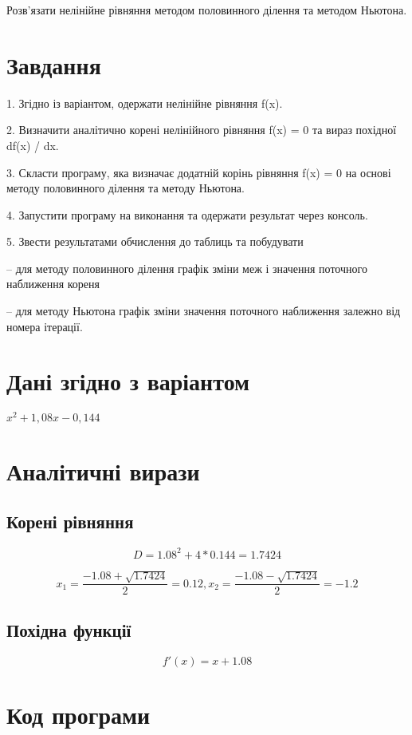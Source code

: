 \documentclass[a4paper, 12pt, oneside]{extarticle}
\renewcommand\Variant{$x^2 + 1,08 x - 0,144$}
\newcommand\tcobx[1]{
\begin{tcolorbox}[breakable, arc=0mm, colback=white, boxrule=0.2mm, beforeafter skip=0pt]
	#1
\end{tcolorbox}
}
\begin{document}
\Margins


\tcobx{
	Розв’язати нелінійне рівняння методом половинного ділення та методом Ньютона.
}

\section*{Завдання}
\tcobx{
	1. Згідно із варіантом, одержати нелінійне рівняння f(x).

2. Визначити аналітично корені нелінійного рівняння f(x) = 0 та вираз похідної df(x) / dx.

3. Скласти програму, яка визначає додатній корінь рівняння f(x) = 0 на основі методу половинного
ділення та методу Ньютона.

4. Запустити програму на виконання та одержати результат через консоль.

5. Звести результатами обчислення до таблиць та побудувати

– для методу половинного ділення графік зміни меж і значення поточного наближення кореня

– для методу Ньютона графік зміни значення поточного наближення залежно від номера ітерації.
}

\section*{Дані згідно з варіантом}

\tcobx{
	\Variant
}

\section*{ Аналітичні вирази }

\subsection*{ Корені рівняння }
\tcobx{
$$
D = 1.08^2+4*0.144 = 1.7424
$$

$$
x_1 = \frac{-1.08+\sqrt{1.7424}}{2} = 0.12,
x_2 = \frac{-1.08-\sqrt{1.7424}}{2}  = -1.2
$$
}

\subsection*{ Похідна функції }
\tcobx {
$$
f'(x) = x + 1.08
$$
}

\section*{ Код програми}
\end{document}
